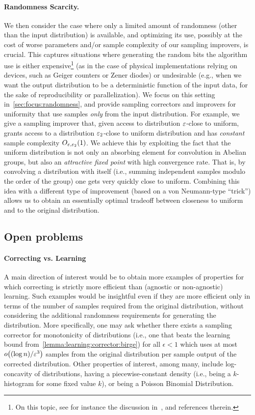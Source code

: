 \paragraph{Randomness Scarcity.}
We {then} consider the case where only a limited amount of randomness (other than the input distribution) is available, and optimizing its use, possibly at the cost of worse parameters and/or sample complexity of our sampling improvers, is crucial. This captures situations where generating the random bits the algorithm use is either expensive\footnote{On this topic, see for instance the discussion in~\cite{KR:94,IZ:89}, and references therein.} (as in the case of physical implementations relying on devices, such as Geiger counters or Zener diodes) or undesirable  (e.g., when we want the output distribution to be a deterministic function of the input data, for the sake of reproducibility or parallelization). We focus on this setting in~\autoref{sec:focus:randomness}, and provide sampling correctors and improvers for uniformity that use samples \emph{only} from the input distribution. For example, we give a sampling improver that, given access to distribution $\varepsilon$-close to uniform, grants access to a distribution $\varepsilon_2$-close to uniform distribution and has \emph{constant} sample complexity $O_{\varepsilon, \varepsilon_2}(1)$. We achieve this by exploiting the fact that the uniform distribution is not only an absorbing element for convolution in Abelian groups, but also an \emph{attractive fixed point} with high convergence rate. That is, by convolving a distribution with itself (i.e., summing independent samples modulo the order of the group) one gets very quickly close to uniform. Combining this idea with a different type of improvement (based on a von Neumann-type ``trick'') allows us to obtain an essentially optimal tradeoff between closeness to uniform and to the original distribution. 


\subsection{Open problems}

\paragraph*{Correcting vs. Learning}
A main direction of
interest would be to obtain more examples of 
properties for which correcting is strictly more efficient than 
(agnostic or non-agnostic) learning.   Such examples would be
insightful even if they are more efficient only
in terms of the number of samples 
required from the original distribution, 
without considering the additional randomness requirements for
generating the distribution.
More specifically, one may ask whether 
there exists a 
sampling corrector for 
monotonicity of 
distributions (i.e., one that beats the learning bound from~\autoref{lemma:learning:corrector:birge})
for all $\epsilon<1$ which uses at most
$\littleO{(\log n)/\eps^3}$ samples from the original distribution per sample
output of the corrected distribution. {Other properties of interest, among many, include log-concavity of distributions, having a piecewise-constant density (i.e., being a $k$-histogram for some fixed value $k$), or being a Poisson Binomial Distribution.}

